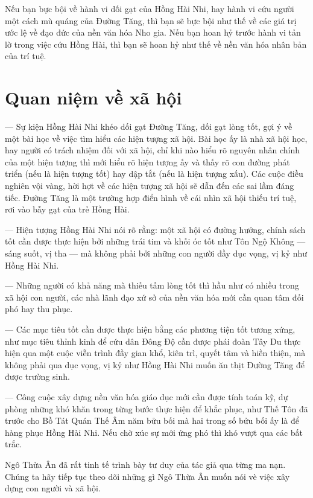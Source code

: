 Nếu bạn bực bội về hành vi dối gạt của Hồng Hài Nhi, hay hành vi cứu người một cách mù quáng của Đường Tăng, thì bạn sẽ bực bội như thế về các giá trị ước lệ về đạo đức của nền văn hóa Nho gia. Nếu bạn hoan hỷ trước hành vi tản lờ trong việc cứu Hồng Hài, thì bạn sẽ hoan hỷ như thế về nền văn hóa nhân bản của trí tuệ.

\section{Quan niệm về xã hội} %
\label{sec:40_41_xa_hoi}

— Sự kiện Hồng Hài Nhi khéo dối gạt Đường Tăng, dối gạt lòng tốt, gợi ý về một bài học về việc tìm hiểu các hiện tượng xã hội. Bài học ấy là nhà xã hội học, hay người có trách nhiệm đối với xã hội, chỉ khi nào hiểu rõ nguyên nhân chính của một hiện tượng thì mới hiểu rõ hiện tượng ấy và thấy rõ con đường phát triển (nếu là hiện tượng tốt) hay dập tắt (nếu là hiện tượng xấu). Các cuộc điều nghiên vội vàng, hời hợt về các hiện tượng xã hội sẽ dẫn đến các sai lầm đáng tiếc. Đường Tăng là một trường hợp điển hình về cái nhìn xã hội thiếu trí tuệ, rơi vào bẫy gạt của trẻ Hồng Hài.

— Hiện tượng Hồng Hài Nhi nói rõ rằng: một xã hội có đường hướng, chính sách tốt cần được thực hiện bởi những trái tim và khối óc tốt như Tôn Ngộ Không — sáng suốt, vị tha — mà không phải bởi những con người đầy dục vọng, vị kỷ như Hồng Hài Nhi.

— Những người có khả năng mà thiếu tấm lòng tốt thì hầu như có nhiều trong xã hội con người, các nhà lãnh đạo xứ sở của nền văn hóa mới cần quan tâm đối phó hay thu phục.

— Các mục tiêu tốt cần được thực hiện bằng các phương tiện tốt tương xứng, như mục tiêu thỉnh kinh để cứu dân Đông Độ cần được phái đoàn Tây Du thực hiện qua một cuộc viễn trình đầy gian khổ, kiên trì, quyết tâm và hiền thiện, mà không phải qua dục vọng, vị kỷ như Hồng Hài Nhi muốn ăn thịt Đường Tăng để được trường sinh.

— Công cuộc xây dựng nền văn hóa giáo dục mới cần được tính toán kỹ, dự phòng những khó khăn trong từng bước thực hiện để khắc phục, như Thế Tôn đã trước cho Bồ Tát Quán Thế Âm năm bửu bối mà hai trong số bửu bối ấy là để hàng phục Hồng Hài Nhi. Nếu chờ xúc sự mới ứng phó thì khó vượt qua các bất trắc.

Ngô Thừa Ân đã rất tinh tế trình bày tư duy của tác giả qua từng ma nạn. Chúng ta hãy tiếp tục theo dõi những gì Ngô Thừa Ân muốn nói vè việc xây dựng con người và xã hội.
